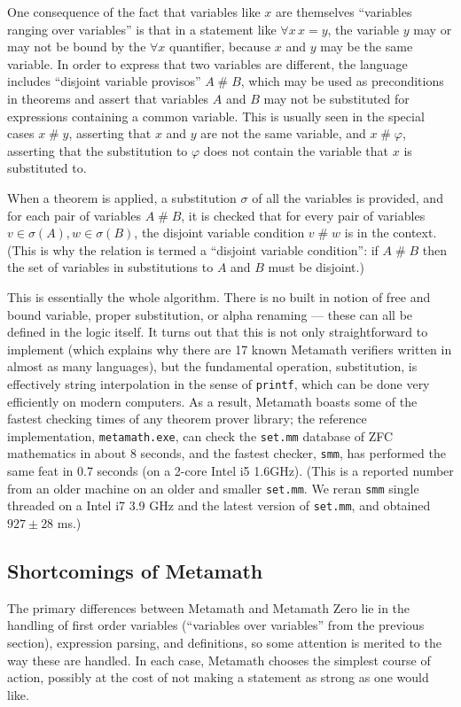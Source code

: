 \documentclass[runningheads]{llncs}
\newcommand{\fresh}{\mathrel{\#}}
\begin{document}
One consequence of the fact that variables like $x$ are themselves ``variables ranging over variables'' is that in a statement like $\forall x\,x=y$, the variable $y$ may or may not be bound by the $\forall x$ quantifier, because $x$ and $y$ may be the same variable. In order to express that two variables are different, the language includes ``disjoint variable provisos'' $A\fresh B$, which may be used as preconditions in theorems and assert that variables $A$ and $B$ may not be substituted for expressions containing a common variable. This is usually seen in the special cases $x\fresh y$, asserting that $x$ and $y$ are not the same variable, and $x\fresh \varphi$, asserting that the substitution to $\varphi$ does not contain the variable that $x$ is substituted to.

When a theorem is applied, a substitution $\sigma$ of all the variables is provided, and for each pair of variables $A\fresh B$, it is checked that for every pair of variables $v\in\sigma(A), w\in \sigma(B)$, the disjoint variable condition $v\fresh w$ is in the context. (This is why the relation is termed a ``disjoint variable condition'': if $A\fresh B$ then the set of variables in substitutions to $A$ and $B$ must be disjoint.)

This is essentially the whole algorithm. There is no built in notion of free and bound variable, proper substitution, or alpha renaming --- these can all be defined in the logic itself. It turns out that this is not only straightforward to implement (which explains why there are 17 known Metamath verifiers written in almost as many languages), but the fundamental operation, substitution, is effectively string interpolation in the sense of \texttt{printf}, which can be done very efficiently on modern computers. As a result, Metamath boasts some of the fastest checking times of any theorem prover library; the reference implementation, \texttt{metamath.exe}, can check the \texttt{set.mm} database of ZFC mathematics in about 8 seconds, and the fastest checker, \texttt{smm}, has performed the same feat in 0.7 seconds (on a 2-core Intel i5 1.6GHz). (This is a reported number from an older machine on an older and smaller \texttt{set.mm}. We reran \texttt{smm} single threaded on a Intel i7 3.9 GHz and the latest version of \texttt{set.mm}, and obtained $927\pm28$ ms.)

\subsection{Shortcomings of Metamath}
The primary differences between Metamath and Metamath Zero lie in the handling of first order variables (``variables over variables'' from the previous section), expression parsing, and definitions, so some attention is merited to the way these are handled. In each case, Metamath chooses the simplest course of action, possibly at the cost of not making a statement as strong as one would like.
\end{document}
